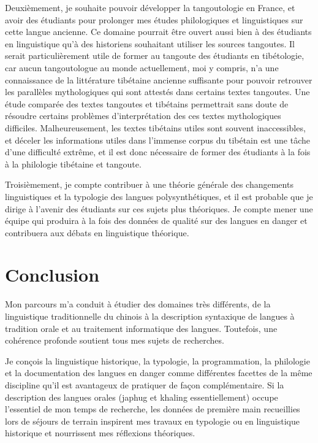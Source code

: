 \documentclass[oldfontcommands,oneside,a4paper,11pt]{memoir}
\begin{document}
Deuxièmement, je souhaite   pouvoir développer la tangoutologie en France, et avoir des étudiants pour prolonger mes études philologiques et linguistiques sur cette langue ancienne. Ce domaine pourrait être ouvert aussi bien à des étudiants en linguistique qu'à des historiens souhaitant utiliser les sources tangoutes. Il serait particulièrement utile de former au tangoute des étudiants en tibétologie, car aucun tangoutologue au monde actuellement, moi y compris, n'a une connaissance de la littérature tibétaine ancienne suffisante pour pouvoir retrouver les parallèles mythologiques qui sont attestés dans certains textes tangoutes. Une étude comparée des textes tangoutes et tibétains permettrait sans doute de résoudre certains problèmes d'interprétation des ces textes mythologiques difficiles. Malheureusement, les textes tibétains utiles sont souvent inaccessibles, et déceler les informations utiles dans l'immense corpus du tibétain est une tâche d'une difficulté extrême, et il est donc nécessaire de former des étudiants à la fois à la philologie tibétaine et tangoute.
 

Troisièmement, je compte  contribuer à une théorie générale des changements linguistiques et la typologie des langues polysynthétiques, et il est probable que je dirige à l'avenir des étudiants sur ces sujets plus théoriques. Je compte mener une équipe qui produira à la fois des données de qualité sur des langues en danger et contribuera aux débats   en linguistique théorique.

\chapter{Conclusion}
Mon parcours m'a conduit à étudier des domaines très différents, de la linguistique traditionnelle du chinois à la description syntaxique de langues à tradition orale et au traitement informatique des langues. Toutefois, une cohérence profonde soutient   tous mes sujets de recherches.

Je conçois la linguistique historique, la typologie, la programmation, la philologie et la documentation des langues en danger  comme différentes facettes de la même discipline qu'il est avantageux de pratiquer de façon complémentaire. Si la description des langues orales (japhug et khaling essentiellement)   occupe l'essentiel de mon temps de recherche, les données de première main recueillies lors de   séjours de terrain  inspirent mes travaux en typologie ou en linguistique historique et nourrissent mes réflexions théoriques.
\end{document}
